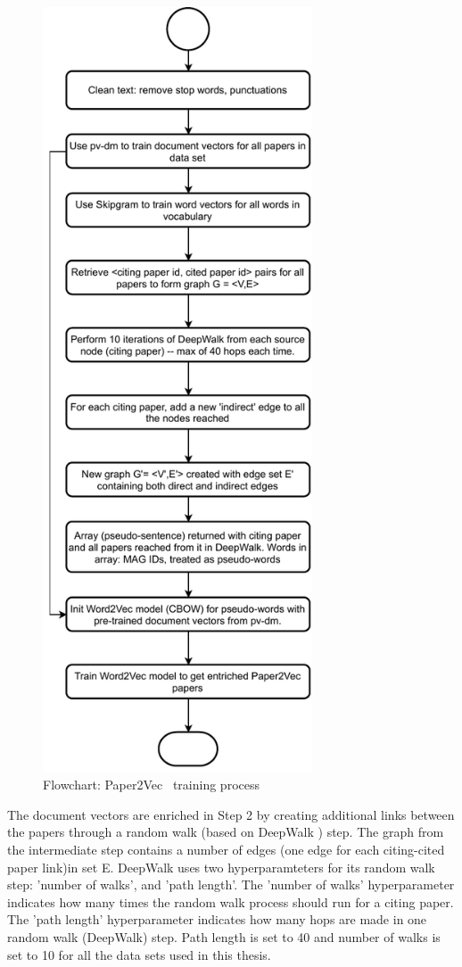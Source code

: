 \begin{figure}
\centering
 \includegraphics[keepaspectratio, width=8cm]{figures/Approach/paper2vecflowchart.pdf}
  \caption{Flowchart: Paper2Vec~\cite{GangulyP17} training process}
  \label{fig:p2vtrain}
\end{figure}
The document vectors are enriched in Step 2 by creating additional links between the papers through a random walk (based on DeepWalk \cite{PerozziAS14}) step. The graph from the intermediate step contains a number of edges (one edge for each citing-cited paper link)in set E. DeepWalk uses two hyperparamteters for its random walk step: 'number of walks', and 'path length'. 
The 'number of walks' hyperparameter indicates how many times the random walk process should run for a citing paper. The 'path length' hyperparameter indicates how many hops are made in one random walk (DeepWalk) step. Path length is set to 40 and number of walks is set to 10 for all the data sets used in this thesis.

